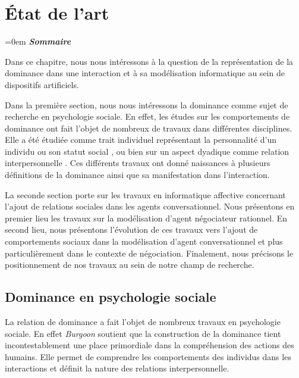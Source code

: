 \chapter{État de l'art }
\label{chap:etat}

\begingroup
\parindent=0em
\emph{\textbf{Sommaire}}
 \localtableofcontents 
\clearpage
\endgroup


Dans ce chapitre, nous nous intéressons à la question de la représentation de la dominance dans une interaction et à sa modélisation informatique au sein de dispositifs artificiels.

Dans la première section, nous nous intéressons la dominance comme sujet de recherche en psychologie sociale. En effet, les études sur les comportements de dominance ont fait l'objet de nombreux de travaux dans différentes disciplines. Elle a été étudiée comme trait individuel représentant la personnalité d'un individu \cite{emmons1991personal} ou son statut social \cite{liska1990dominance}, ou bien sur un aspect dyadique comme relation interpersonnelle \cite{burgoon2006nonverbal}. Ces différents travaux ont donné naissances à plusieurs définitions de la dominance ainsi que sa manifestation dans l'interaction.

La seconde section porte sur les travaux en informatique affective concernant l'ajout de relations sociales dans les agents conversationnel. Nous présentons en premier lieu les travaux sur la modélisation d'agent négociateur rationnel. En second lieu, nous présentons l'évolution de ces travaux vers l'ajout de comportements sociaux dans la modélisation d'agent conversationnel et plus particulièrement dans le contexte de négociation. Finalement, nous précisons le positionnement de nos travaux au sein de notre champ de recherche.

\section{Dominance en psychologie sociale}
	La relation de dominance a fait l'objet de nombreux travaux en psychologie sociale. En effet \emph{Burgoon} soutient que la construction de la dominance tient incontestablement une place primordiale dans la compréhension des actions des humains\cite{burgoon1995interpersonal}. Elle permet de comprendre les comportements des individus dans les interactions et définit la nature des relations interpersonnelle. 
	
